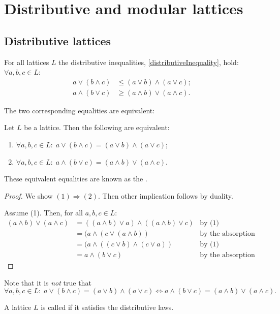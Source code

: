 \section{Distributive and modular lattices}
\subsection{Distributive lattices}
For all lattices $L$ the distributive inequalities, \ref{distributiveInequality}, hold: $\forall a,b,c \in L$:
\begin{align*}
a \vee (b\wedge c) &\leq (a\vee b) \wedge (a\vee c); \\
a\wedge (b \vee c) &\geq (a\wedge b)\vee (a\wedge c).
\end{align*}

The two corresponding equalities are equivalent:
\begin{proposition} \label{equivalenceDistributiveLaws}
Let $L$ be a lattice. Then the following are equivalent:
\begin{enumerate}
\item $\forall a,b,c \in L: \; a \vee (b\wedge c) = (a\vee b) \wedge (a\vee c)$;
\item $\forall a,b,c \in L: \; a\wedge (b \vee c) = (a\wedge b)\vee (a\wedge c)$.
\end{enumerate}
\end{proposition}
These equivalent equalities are known as the .
\begin{proof}
We show $(1)\Rightarrow (2)$. Then other implication follows by duality.

Assume (1). Then, for all $a,b,c \in L$:
\begin{align*}
(a\wedge b)\vee (a\wedge c) &= ((a\wedge b)\vee a) \wedge ((a\wedge b)\vee c) & \text{by (1)}\\
&= (a\wedge (c\vee (a\wedge b))  & \text{by the absorption law}\\
&= (a \wedge ((c\vee b) \wedge (c\vee a))  & \text{by (1)}\\
&= a\wedge (b\vee c) & \text{by the absorption law.}
\end{align*}
\end{proof}
Note that it is \emph{not} true that
\[ \forall a,b,c \in L: \; a \vee (b\wedge c) = (a\vee b) \wedge (a\vee c) \iff a\wedge (b \vee c) = (a\wedge b)\vee (a\wedge c). \]

\begin{definition}
A lattice $L$ is called  if it satisfies the distributive laws.
\end{definition}

